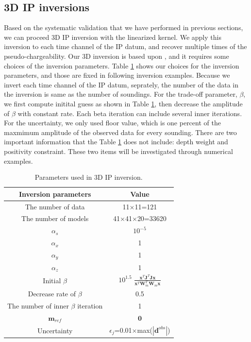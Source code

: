 \documentclass[a4paper, 11pt]{article}
\begin{document}
\subsection{3D IP inversions}
Based on the systematic validation that we have performed in previous sections, we can proceed 3D IP inversion with the linearized kernel.
We apply this inversion to each time channel of the IP datum, and recover multiple times of the pseudo-chargeability. 
Our 3D inversion is based upon \cite{doug1994,Li2000}, and it requires some choices of the inversion parameters. 
Table \ref{table:inversion_params} shows our choices for the inversion parameters, and those are fixed in following inversion examples. 
Because we invert each time channel of the IP datum, seprately, the number of the data in the inversion is same as the number of soundings. 
For the trade-off parameter, $\beta$, we first compute initital guess as shown in Table \ref{table:inversion_params}, then decrease the amplitude of $\beta$ with constant rate. 
Each beta iteration can include several inner iterations. 
For the uncertainty, we only used floor value, which is one percent of the maxmimum amplitude of the observed data for every sounding. 
There are two important information that the Table \ref{table:inversion_params} does not include: depth weight and positivity constraint. 
These two items will be investigated through numerical examples. 

\begin{table}[ht]
  \caption{Parameters used in 3D IP inversion.} %
  \centering %
  \begin{tabular}{c c} %
  \hline\hline %
  Inversion parameters & Value \\
  [0.1ex] %
  \hline
  The number of data &    11$\times$11=121 \\
  The number of models &  41$\times$41$\times$20=33620 \\
  $\alpha_s$ &  $10^{-5}$\\
  $\alpha_x$ &  1\\
  $\alpha_y$ &  1\\
  $\alpha_z$ &  1\\
  Initial $\beta$ &  $10^{1.5}$ $\frac{\mathbf{x}^T\mathbf{J}^T\mathbf{J}\mathbf{x}}{\mathbf{x}^T\mathbf{W}_m^T\mathbf{W}_m\mathbf{x}}$\\
  Decrease rate of $\beta$ &  0.5\\
  The number of inner $\beta$ iteration & 1\\
  $\mathbf{m}_{ref}$ & $\mathbf{0}$ \\
  Uncertainty & $\epsilon_j$=0.01$\times$max($|\mathbf{d}^{obs}|$) \\
  \hline %
  \end{tabular}
  \label{table:inversion_params} %
\end{table}
\end{document}
